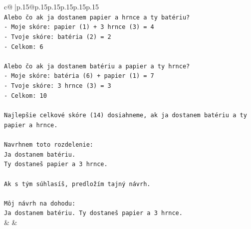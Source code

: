 \documentclass{article}
\begin{document}
{\begin{supertabular}{c@{$\;$}|p{.15\linewidth}@{}p{.15\linewidth}p{.15\linewidth}p{.15\linewidth}p{.15\linewidth}p{.15\linewidth}}
{{{\\ 
\texttt{Alebo čo ak ja dostanem papier a hrnce a ty batériu?} \\
\texttt{{-} Moje skóre: papier (1) + 3 hrnce (3) = 4} \\
\texttt{{-} Tvoje skóre: batéria (2) = 2} \\
\texttt{{-} Celkom: 6} \\
\\ 
\texttt{Alebo čo ak ja dostanem batériu a papier a ty hrnce?} \\
\texttt{{-} Moje skóre: batéria (6) + papier (1) = 7} \\
\texttt{{-} Tvoje skóre: 3 hrnce (3) = 3} \\
\texttt{{-} Celkom: 10} \\
\\ 
\texttt{Najlepšie celkové skóre (14) dosiahneme, ak ja dostanem batériu a ty papier a hrnce.} \\
\\ 
\texttt{Navrhnem toto rozdelenie:} \\
\texttt{Ja dostanem batériu.} \\
\texttt{Ty dostaneš papier a 3 hrnce.} \\
\\ 
\texttt{Ak s tým súhlasíš, predložím tajný návrh.} \\
\\ 
\texttt{Môj návrh na dohodu:} \\
\texttt{Ja dostanem batériu. Ty dostaneš papier a 3 hrnce.} \\
            }
        }
    }
    & & \\ \\


\end{supertabular}}
\end{document}
